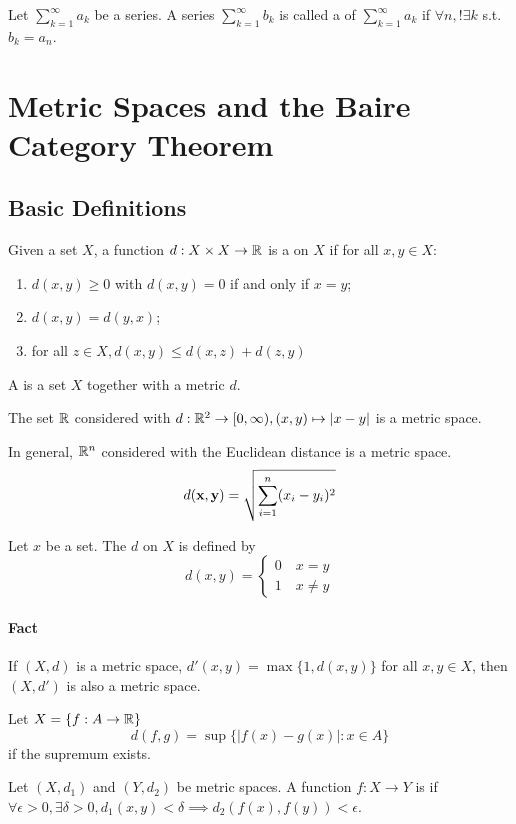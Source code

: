 \documentclass[11pt]{article}
\begin{document}
 Let $\sum_{k=1}^\infty a_k$ be a series. A series $\sum_{k=1}^\infty b_k$ is called a  of $\sum_{k=1}^\infty a_k$ if $\forall n, !\exists k$ s.t. $b_k = a_n$.


\section{Metric Spaces and the Baire Category Theorem}
\subsection{Basic Definitions}
 Given a set $X$, a function $d: X \times X \rightarrow \mathbb{R}$ is a  on $X$ if for all $x, y \in X$:
\begin{enumerate}
	\item $d(x,y) \geq 0$ with $d(x,y) = 0$ if and only if $x = y$;
	\item $d(x,y) = d(y,x)$;
	\item for all $z \in X, d(x, y) \leq d(x,z) + d(z,y)$
\end{enumerate}
A  is a set $X$ together with a metric $d$.

\example
The set $\mathbb{R}$ considered with $d: \mathbb{R}^2 \rightarrow [0, \infty), (x,y) \mapsto |x - y|$ is a metric space.

\example
In general, $\mathbb{R}^n$ considered with the Euclidean distance is a metric space.
$$d(\textbf{x}, \textbf{y}) = \sqrt{\sum_{i=1}^n (x_i - y_i)^2}$$

\example
Let $x$ be a set. The  $d$ on $X$ is defined by
$$d(x,y) = \begin{cases}
	0 \quad x = y \\
	1 \quad x \neq y
\end{cases}$$

\paragraph{Fact} If $(X, d)$ is a metric space, $d'(x,y) = \max\{1, d(x,y)\}$ for all $x, y \in X$, then $(X, d')$ is also a metric space.

\example
Let $X = \{f: A \rightarrow \mathbb{R}\}$ \\
$$d(f,g) = \sup\{|f(x) - g(x)|: x \in A\}$$ if the supremum exists.

Let $(X, d_1)$ and $(Y, d_2)$ be metric spaces. A function $f: X \rightarrow Y$ is  if $\forall \epsilon > 0, \exists \delta > 0, d_1(x,y) < \delta \implies d_2(f(x), f(y)) < \epsilon$.
\end{document}
